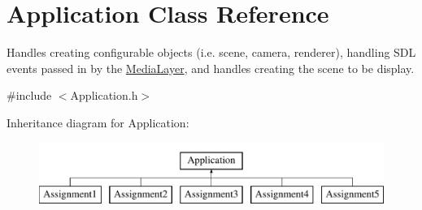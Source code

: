 \hypertarget{class_application}{}\section{Application Class Reference}
\label{class_application}


Handles creating configurable objects (i.\+e. scene, camera, renderer), handling S\+DL events passed in by the \hyperlink{class_media_layer}{Media\+Layer}, and handles creating the scene to be display.  




{\ttfamily \#include $<$Application.\+h$>$}

Inheritance diagram for Application\+:\begin{figure}[H]
\begin{center}
\leavevmode
\includegraphics[height=2.000000cm]{class_application}
\end{center}
\end{figure}
